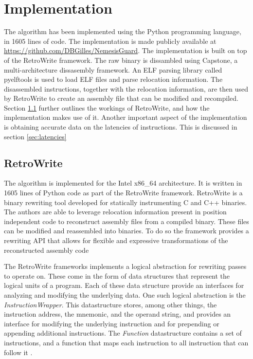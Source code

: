 
\chapter{Implementation}
\label{cha:implementation}
The algorithm has been implemented using the Python programming language, in 1605 lines of code. 
The implementation is made publicly available at  \url{https://github.com/DBGilles/NemesisGuard}. 
The implementation is built on top of the RetroWrite framework. 
The raw binary is dissambled using Capstone, a multi-architecture dissasembly framework. An ELF parsing library called pyelftools is used to load ELF files and parse relocation information. 
The disassembled instructions, together with the relocation information, are then used by RetroWrite to create an assembly file that can be modified and recompiled. 
Section \ref{sec:retrowrite} further outlines the workings of RetroWrite, and how the implementation makes use of it. 
Another important aspect of the implementation is obtaining accurate data on the latencies of instructions. 
This is discussed in section  \ref{sec:latencies}


\section{RetroWrite}
\label{sec:retrowrite}
The algorithm is implemented for the Intel x86\_64 architecture. It is written in 1605 lines of Python code as part of the RetroWrite framework. 
RetroWrite is a binary rewriting tool developed for statically instrumenting C and C++ binaries. 
The authors are able to leverage relocation information present in position independent code to reconstruct assembly files from a compiled binary. 
These files can be modified and reassembled into binaries. 
To do so the framework provides a rewriting API that allows for flexible and expressive transformations of the reconstructed assembly code \cite{Dinesh2020RetroWriteSI}

The RetroWrite frameworks implements a logical abstraction for rewriting passes to operate on.
These come in the form of data structures that represent the logical units of a program.
Each of these data structure provide an interfaces for analyzing and modifying the underlying data. 
One such logical abstraction is the \textit{InstructionWrapper}. 
This datastructure stores, among other things, the instruction address, the mnemonic, and the operand string, and provides an interface
for modifying the underlying instruction and for prepending or appending additional instructions.  
The \textit{Function} datastructure contains a set of instructions, and a function that maps each instruction to all instruction that can follow it \cite{Dinesh2020RetroWriteSI, hexhive}. 

